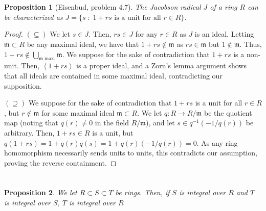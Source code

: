 \documentclass[english]{article}
\newcommand{\mfr}{\mathfrak{m}}
\newcommand{\prob}[1]{\setcounter{section}{#1-1}\section{}}
\newtheorem*{prop*}{Proposition}
\theoremstyle{remark}
\theoremstyle{definition}
\newcommand{\idl}[1]{\left\langle{#1}\right\rangle }
\begin{document}
%
%
%
%
\prob{12}\begin{prop*}[Eisenbud, problem 4.7]
The Jacobson radical $J$ of a ring $R$ can be characterized as $J=\{s\;:\;1+rs\text{ is a unit for all } r\in R\}$.  
\end{prop*}
\begin{proof}
	$(\subseteq)$ We let $s\in J$. Then, $rs\in J$ for any $r\in R$ as $J$ is an ideal. Letting $\mfr\subset R$ be any maximal ideal, we have that $1+rs\notin \mfr$ as $rs\in \mfr$ but $1\notin \mfr$. Thus, $1+rs\notin \bigcup_{\mfr \text{ max.}}\mfr$. We suppose for the sake of contradiction that $1+rs$ is a non-unit. Then, $\idl{1+rs}$ is a proper ideal, and a Zorn's lemma argument shows that all ideals are contained in some maximal ideal, contradicting our supposition. 
	
	$(\supseteq)$ We suppose for the sake of contradiction that $1+rs$ is a unit for all $r\in R$, but $r\notin \mfr$ for some maximal ideal $\mfr\subset R$. We let $q:R\to R/\mfr$ be the quotient map (noting that $q(r)\neq 0$ in the field $R/\mfr$), and let $s\in q^{-1}(-1/q(r))$ be arbitrary. Then, $1+rs\in R$ is a unit, but $q(1+rs)=1+q(r)q(s)=1+q(r)\left(-1/q(r)\right)=0$. As any ring homomorphism necessarily sends units to units, this contradicts our assumption, proving the reverse containment.
\end{proof}
%
%
\prob{13}
\begin{prop*}
	We let $R\subset S\subset T$ be rings. Then, if $S$ is integral over $R$ and $T$ is integral over $S$, $T$ is integral over $R$
	\end{prop*}
\end{document}
